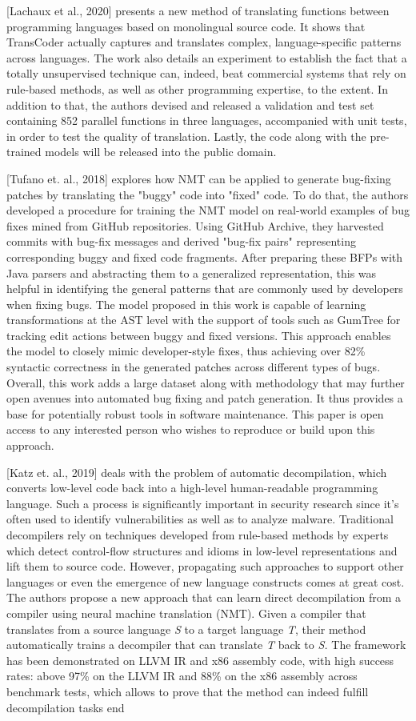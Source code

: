 \documentclass{dhbenelux}
\begin{document}
[Lachaux et al., 2020] presents a new method of translating functions between programming languages based on monolingual source code. It shows that TransCoder actually captures and translates complex, language-specific patterns across languages. The work also details an experiment to establish the fact that a totally unsupervised technique can, indeed, beat commercial systems that rely on rule-based methods, as well as other programming expertise, to the extent. In addition to that, the authors devised and released a validation and test set containing 852 parallel functions in three languages, accompanied with unit tests, in order to test the quality of translation. Lastly, the code along with the pre-trained models will be released into the public domain.

[Tufano et. al., 2018] explores how NMT can be applied to generate bug-fixing patches by translating the "buggy" code into "fixed" code. To do that, the authors developed a procedure for training the NMT model on real-world examples of bug fixes mined from GitHub repositories. Using GitHub Archive, they harvested commits with bug-fix messages and derived "bug-fix pairs" representing corresponding buggy and fixed code fragments. After preparing these BFPs with Java parsers and abstracting them to a generalized representation, this was helpful in identifying the general patterns that are commonly used by developers when fixing bugs. The model proposed in this work is capable of learning transformations at the AST level with the support of tools such as GumTree for tracking edit actions between buggy and fixed versions. This approach enables the model to closely mimic developer-style fixes, thus achieving over 82\% syntactic correctness in the generated patches across different types of bugs. Overall, this work adds a large dataset along with methodology that may further open avenues into automated bug fixing and patch generation. It thus provides a base for potentially robust tools in software maintenance. This paper is open access to any interested person who wishes to reproduce or build upon this approach.

[Katz et. al., 2019] deals with the problem of automatic decompilation, which converts low-level code back into a high-level human-readable programming language. Such a process is significantly important in security research since it's often used to identify vulnerabilities as well as to analyze malware. Traditional decompilers rely on techniques developed from rule-based methods by experts which detect control-flow structures and idioms in low-level representations and lift them to source code. However, propagating such approaches to support other languages or even the emergence of new language constructs comes at great cost. The authors propose a new approach that can learn direct decompilation from a compiler using neural machine translation (NMT). Given a compiler that translates from a source language \textit{S} to a target language \textit{T}, their method automatically trains a decompiler that can translate \textit{T} back to \textit{S.} The framework has been demonstrated on LLVM IR and x86 assembly code, with high success rates: above 97\% on the LLVM IR and 88\% on the x86 assembly across benchmark tests, which allows to prove that the method can indeed fulfill decompilation tasks end
\end{document}
